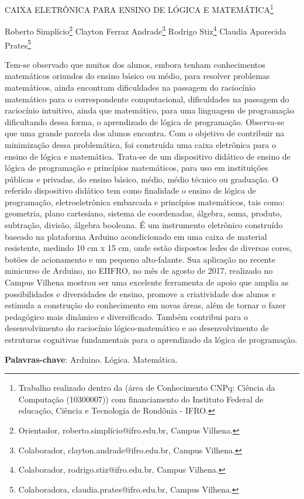 \documentclass[article,12pt,onesidea,4paper,english,brazil]{abntex2}
\begin{document}
	
	
	\frenchspacing 
	
	\begin{center}
		\LARGE CAIXA ELETRÔNICA PARA ENSINO DE LÓGICA E MATEMÁTICA\footnote{Trabalho realizado dentro da (área de Conhecimento CNPq: Ciência da Computação (10300007))
		com financiamento do Instituto Federal de educação, Ciência e Tecnologia de Rondônia - IFRO.}
		
		\normalsize
		Roberto Simplício\footnote{Orientador, roberto.simplício@ifro.edu.br, Campus Vilhena.} 
		Clayton Ferraz Andrade\footnote{Colaborador, clayton.andrade@ifro.edu.br, Campus Vilhena.} 
		Rodrigo Stiz\footnote{Colaborador, rodrigo.stiz@ifro.edu.br, Campus Vilhena.} 
		Claudia Aparecida Prates\footnote{Colaboradora, claudia.prates@ifro.edu.br, Campus Vilhena.} 
	\end{center}
	
	\noindent Tem-se observado que muitos dos alunos, embora tenham conhecimentos
	matemáticos oriundos do ensino básico ou médio, para resolver problemas
	matemáticos, ainda encontram dificuldades na passagem do raciocínio matemático
	para o correspondente computacional, dificuldades na passagem do raciocínio
	intuitivo, ainda que matemático, para uma linguagem de programação dificultando
	dessa forma, o aprendizado de lógica de programação. Observa-se que uma grande
	parcela dos alunos encontra. Com o objetivo de contribuir na minimização dessa
	problemática, foi construída uma caixa eletrônica para o ensino de lógica e
	matemática. Trata-se de um dispositivo didático de ensino de lógica de programação
	e princípios matemáticos, para uso em instituições públicas e privadas, do ensino
	básico, médio, médio técnico ou graduação. O referido dispositivo didático tem como
	finalidade o ensino de lógica de programação, eletroeletrônica embarcada e
	princípios matemáticos, tais como: geometria, plano cartesiano, sistema de
	coordenadas, álgebra, soma, produto, subtração, divisão, álgebra booleana. É um
	instrumento eletrônico construído baseado na plataforma Arduino acondicionado em
	uma caixa de material resistente, medindo 10 cm x 15 cm, onde estão dispostos
	ledes de diversas cores, botões de acionamento e um pequeno alto-falante. Sua
	aplicação no recente minicurso de Arduino, no EIIFRO, no mês de agosto de 2017,
	realizado no Campus Vilhena mostrou ser uma excelente ferramenta de apoio que
	amplia as possibilidades e diversidades de ensino, promove a criatividade dos
	alunos e estimula a construção do conhecimento em novas áreas, além de tornar o
	fazer pedagógico mais dinâmico e diversificado. Também contribui para o
	desenvolvimento do raciocínio lógico-matemático e ao desenvolvimento de
	estruturas cognitivas fundamentais para o aprendizado da lógica de programação.
	
	\vspace{\onelineskip}
	
	\noindent
	\textbf{Palavras-chave}: Arduino. Lógica. Matemática.
	
\end{document}
